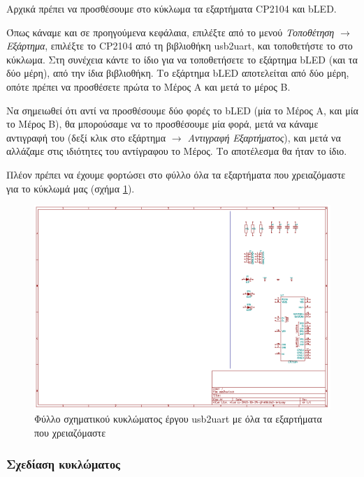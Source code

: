 \documentclass[a4paper]{article}
\begin{document}
Αρχικά πρέπει να προσθέσουμε στο κύκλωμα τα εξαρτήματα CP2104 και bLED. 

Όπως κάναμε και σε προηγούμενα κεφάλαια, επιλέξτε από το μενού \textit{Τοποθέτηση $\rightarrow$ Εξάρτημα}, επιλέξτε το CP2104 από τη βιβλιοθήκη usb2uart, και τοποθετήστε το στο κύκλωμα. Στη συνέχεια κάντε το ίδιο για να τοποθετήσετε το εξάρτημα bLED (και τα δύο μέρη), από την ίδια βιβλιοθήκη. Το εξάρτημα bLED αποτελείται από δύο μέρη, οπότε πρέπει να προσθέσετε πρώτα το Μέρος Α και μετά το μέρος Β.

Να σημειωθεί ότι αντί να προσθέσουμε δύο φορές το bLED (μία το Μέρος Α, και μία το Μέρος Β), θα μπορούσαμε να το προσθέσουμε μία φορά, μετά να κάναμε αντιγραφή του (δεξί κλικ στο εξάρτημα \textit{$\rightarrow$ Αντιγραφή Εξαρτήματος}), και μετά να αλλάζαμε στις ιδιότητες του αντίγραφου το Μέρος. Το αποτέλεσμα θα ήταν το ίδιο.

Πλέον πρέπει να έχουμε φορτώσει στο φύλλο όλα τα εξαρτήματα που χρειαζόμαστε για το κύκλωμά μας (σχήμα \ref{fig:eesch-circ-allcomp}).

\begin{figure}
  \begin{center}
    \includegraphics[width=.9\textwidth]{img/eesch-circ-allcomp.png}
    \caption{Φύλλο σχηματικού κυκλώματος έργου usb2uart με όλα τα εξαρτήματα που χρειαζόμαστε}
    \label{fig:eesch-circ-allcomp}
  \end{center}
\end{figure}


\subsubsection{Σχεδίαση κυκλώματος}
\end{document}
